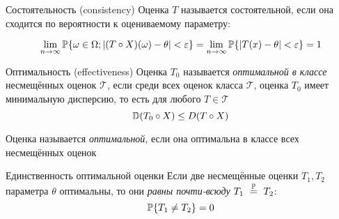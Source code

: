 \begin{dfn}{Состоятельность (consistency)}
Оценка $T$ называется состоятельной,
если она сходится по вероятности к оцениваемому параметру:

$$\lim_{n\to\infty}
    \mathbb P\{\omega\in\Omega; \left|(T\circ X)(\omega) - \theta\right| < \varepsilon \}
= \lim_{n\to\infty}
    \mathbb P\{\left|T(x) - \theta\right| < \varepsilon\}
= 1$$
\end{dfn}

\begin{dfn}{Оптимальность (effectiveness)}
Оценка $T_0$ называется \emph{оптимальной в классе} несмещённых оценок $\mathcal T$,
если среди всех оценок класса $\mathcal T$,
оценка $T_0$ имеет минимальную дисперсию,
то есть для любого $T\in\mathcal T$
$$\mathbb D(T_0\circ X) \leq D(T\circ X)$$

Оценка называется \emph{оптимальной},
если она оптимальна в классе всех несмещённых оценок
\end{dfn}

\begin{thm}{Единственность оптимальной оценки}
Если две несмещённые оценки $T_1, T_2$ параметра $\theta$ оптимальны,
то они \emph{равны почти-всюду} $T_1~\overset{\mathbb P}{=}~T_2$:
  $$\mathbb P\{T_1\neq T_2\} = 0$$
\end{thm}
